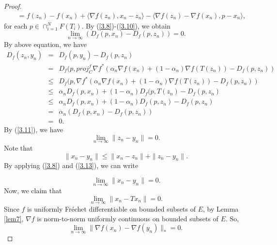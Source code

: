\documentclass[reqno,b5paper]{amsart}
\theoremstyle{plain}
\theoremstyle{definition}
\numberwithin{equation}{section}
\numberwithin{equation}{section}
\begin{document}
\begin{proof}
\begin{eqnarray*}
&&=f(z_{n})-f(x_{n})+\langle \nabla f(z_{n}),x_{n}-z_{n}\rangle-\langle \nabla f(z_{n})-\nabla f(x_{n}),p-x_{n}\rangle,
\end{eqnarray*}
for each $p\in \cap_{i=1}^{N}F(T_{i})$. By (\ref{3.8})-(\ref{3.10}), we obtain
\begin{equation}\label{3.11}
\lim_{n\to\infty}(D_{f}(p,x_{n})-D_{f}(p,z_{n}))=0.
\end{equation}
By above equation, we have
\begin{eqnarray*}
D_{f}(z_{n},y_{n})&=&D_{f}(p,y_{n})-D_{f}(p,z_{n})\\
&=&D_{f}(p,proj_{C}^{f}\nabla f^{*}(\alpha_{n}\nabla f(x_{n})+(1-\alpha_{n})\nabla f(T(z_{n}))-D_{f}(p,z_{n}))\\
&\leq&D_{f}(p,\nabla f^{*}(\alpha_{n}\nabla f(x_{n})+(1-\alpha_{n})\nabla f(T(z_{n}))-D_{f}(p,z_{n}))\\
&\leq& \alpha_{n}D_{f}(p,x_{n})+(1-\alpha_{n})D_{f}(p,T(z_{n})-D_{f}(p,z_{n})\\
&\leq&\alpha_{n}D_{f}(p,x_{n})+(1-\alpha_{n})D_{f}(p,z_{n})-D_{f}(p,z_{n})\\
&=&\alpha_{n}(D_{f}(p,x_{n})-D_{f}(p,z_{n}))\\
&=&0.
\end{eqnarray*}
By (\ref{3.11}), we have
\begin{equation}\label{3.13}
\lim_{n\to\infty}\|z_{n}-y_{n}\|=0.
\end{equation}
Note that
$$\|x_{n}-y_{n}\|\leq \|x_{n}-z_{n}\|+\|z_{n}-y_{n}\|.$$
By applying (\ref{3.8}) and (\ref{3.13}), we can write

\begin{equation}\label{15}
\lim_{n\to\infty}\|x_{n}-y_{n}\|=0.
\end{equation}
Now, we claim that 
\begin{equation}\label{22}
\lim_{n\to\infty}\|x_{n}-Tx_{n}\|=0.
\end{equation}
Since $f$ is  uniformly Fr\'{e}chet differentiable on bounded subsets of $E$, by Lemma \ref{lem7}, $\nabla f$ is norm-to-norm uniformly continuous on bounded subsets of $E$. So,
\begin{equation}\label{16}
\lim_{n\to\infty}\|\nabla f(x_{n})-\nabla f(y_{n})\|_{*}=0.
\end{equation}


\end{proof}
\end{document}
